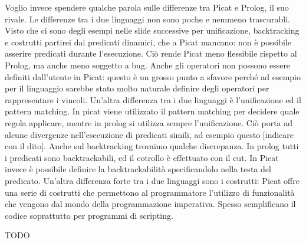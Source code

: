 \documentclass[11pt]{article}
\begin{document}
Voglio invece spendere qualche parola sulle differenze tra Picat e
Prolog, il suo rivale. Le differenze tra i due linguaggi non sono
poche e nemmeno trascurabli. Visto che ci sono degli esempi nelle
slide successive per unificazione, backtracking e costrutti partirei
dai predicati dinamici, che a Picat mancano: non è possibile asserire
predicati durante l'esecuzione. Ciò rende Picat meno flessibile
rispetto al Prolog, ma anche meno soggetto a bug. Anche gli operatori
non possono essere definiti dall'utente in Picat: questo è un grosso
punto a sfavore perché ad esempio per il linguaggio \lset{} sarebbe
stato molto naturale definire degli operatori per rappresentare i
vincoli. Un'altra differenza tra i due linguaggi è l'unificazione ed
il pattern matching. In picat viene utilizzato il pattern matching per
decidere quale regola applicare, mentre in prolog si utilizza sempre
l'unificazione. Ciò porta ad alcune divergenze nell'esecuzione di
predicati simili, ad esempio questo [indicare con il dito]. Anche sul
backtracking trovaimo qualche discrepanza. In prolog tutti i predicati
sono backtrackabili, ed il cotrollo è effettuato con il cut. In Picat
invece è possibile definire la backtrackabilità specificandolo nella
testa del predicato. Un'altra differenza forte tra i due linguaggi
sono i costrutti: Picat offre una serie di costrutti che permettono al
programmatore l'utilizzo di funzionalità che vengono dal mondo della
programmazione imperativa. Spesso semplificano il codice soprattutto
per programmi di scripting.

TODO
\end{document}
